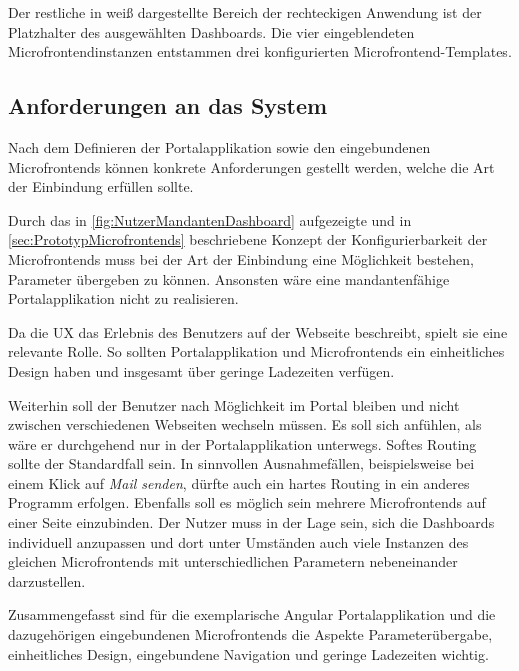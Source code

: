 Der restliche in weiß dargestellte Bereich der rechteckigen Anwendung ist der Platzhalter des ausgewählten Dashboards. Die vier eingeblendeten Microfrontendinstanzen entstammen drei konfigurierten Microfrontend-Templates.

\subsection{Anforderungen an das System}\label{sec:PrototypAnforderungen}

Nach dem Definieren der Portalapplikation sowie den eingebundenen Microfrontends können konkrete Anforderungen gestellt werden, welche die Art der Einbindung erfüllen sollte.

Durch das in \cref{fig:NutzerMandantenDashboard} aufgezeigte und in \cref{sec:PrototypMicrofrontends} beschriebene Konzept der Konfigurierbarkeit der Microfrontends muss bei der Art der Einbindung eine Möglichkeit bestehen, Parameter übergeben zu können. Ansonsten wäre eine mandantenfähige Portalapplikation nicht zu realisieren.

Da die \gls{UX} das Erlebnis des Benutzers auf der Webseite beschreibt, spielt sie eine relevante Rolle. So sollten Portalapplikation und Microfrontends ein einheitliches Design haben und insgesamt über geringe Ladezeiten verfügen.

Weiterhin soll der Benutzer nach Möglichkeit im Portal bleiben und nicht zwischen verschiedenen Webseiten wechseln müssen. Es soll sich anfühlen, als wäre er durchgehend nur in der Portalapplikation unterwegs. Softes Routing sollte der Standardfall sein.\newline
In sinnvollen Ausnahmefällen, beispielsweise bei einem Klick auf \textit{Mail senden}, dürfte auch ein hartes Routing in ein anderes Programm erfolgen. Ebenfalls soll es möglich sein mehrere Microfrontends auf einer Seite einzubinden. 
Der Nutzer muss in der Lage sein, sich die Dashboards individuell anzupassen und dort unter Umständen auch viele Instanzen des gleichen Microfrontends mit unterschiedlichen Parametern nebeneinander darzustellen.

Zusammengefasst sind für die exemplarische Angular Portalapplikation und die dazugehörigen eingebundenen Microfrontends die Aspekte Parameterübergabe, einheitliches Design, eingebundene Navigation und geringe Ladezeiten wichtig.